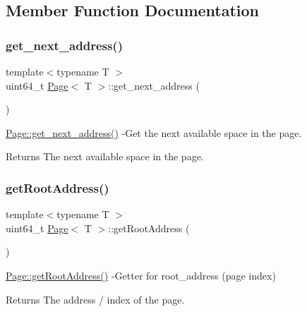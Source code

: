 \subsection{Member Function Documentation}
\mbox{\label{class_page_ae6ac153d53ddb0493a4fff270dfa42cb}} 
\subsubsection{\texorpdfstring{get\+\_\+next\+\_\+address()}{get\_next\_address()}}
{\footnotesize\ttfamily template$<$typename T $>$ \\
uint64\+\_\+t \hyperlink{class_page}{Page}$<$ T $>$\+::get\+\_\+next\+\_\+address (\begin{DoxyParamCaption}{ }\end{DoxyParamCaption})}

\hyperlink{class_page_ae6ac153d53ddb0493a4fff270dfa42cb}{Page\+::get\+\_\+next\+\_\+address()} -\/\+Get the next available space in the page. \begin{DoxyReturn}{Returns}
The next available space in the page. 
\end{DoxyReturn}
\mbox{\label{class_page_a438a928e0ce67dc404f183678eb533ec}} 
\subsubsection{\texorpdfstring{get\+Root\+Address()}{getRootAddress()}}
{\footnotesize\ttfamily template$<$typename T $>$ \\
uint64\+\_\+t \hyperlink{class_page}{Page}$<$ T $>$\+::get\+Root\+Address (\begin{DoxyParamCaption}{ }\end{DoxyParamCaption})}

\hyperlink{class_page_a438a928e0ce67dc404f183678eb533ec}{Page\+::get\+Root\+Address()} -\/\+Getter for root\+\_\+address (page index) \begin{DoxyReturn}{Returns}
The address / index of the page. 
\end{DoxyReturn}
\mbox{\label{class_page_a8c27abd6fb2ce55c05b065584b4bcc75}} 
